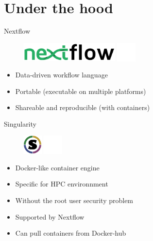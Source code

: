 \documentclass[usepdftitle=false]{beamer}
\begin{document}
\section{Under the hood}

\begin{frame}{Nextflow}
	\begin{figure}
		\includegraphics[height=1cm]{pictures/nextflow.png}
		\includegraphics[height=1cm]{pictures/blank}
	\end{figure}
	\begin{itemize}
		\item Data-driven workflow language
		\pause
		\item Portable (executable on multiple platforms)
		\pause
		\item Shareable and reproducible (with containers)
	\end{itemize}
	\vfill
\end{frame}

\begin{frame}{Singularity}
	\begin{figure}
		\includegraphics[height=1cm]{pictures/Singularity_logo}
		\includegraphics[height=1cm]{pictures/blank}
	\end{figure}
	\begin{itemize}
		\item Docker-like container engine
		\item Specific for HPC environnment
		\pause
		\item Without the root user security problem
		\pause
		\item Supported by Nextflow
		\pause
		\item Can pull containers from Docker-hub
	\end{itemize}
\end{frame}
\end{document}
